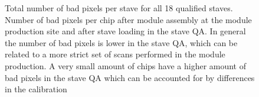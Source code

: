 %
\begin{figure}
        \centering
       \caption{ Total number of bad pixels per stave for all 18 qualified staves. 	 Number of bad pixels per chip after module assembly at the module
production site and after stave loading in the stave QA. In general the
number of bad pixels is lower in the stave QA, which can be related to a
more strict set of scans performed in the module production. A very small
amount of chips have a higher amount of bad pixels in the stave QA which
can be accounted for by differences in the calibration}
       
         \label{fig:baddiscfull}
\end{figure}

